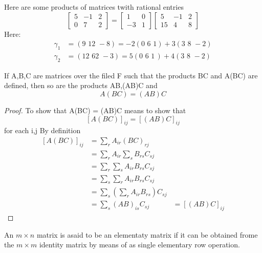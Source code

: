 \begin{example}
	Here are some products of matrices twith rational entries
	\[
		\begin{bmatrix}
			5 & -1 & 2 \\
			0 & 7  & 2
		\end{bmatrix} = \begin{bmatrix}
			1  & 0 \\
			-3 & 1
		\end{bmatrix} \begin{bmatrix} 5  & -1 & 2 \\
                15 & 4  & 8
		\end{bmatrix}
	\]
	Here:
	\[
		\begin{aligned}
			\gamma_{1} & =(9\,\,12\,\, -8) = -2(0\,\,6\,\,1)+3(3\,\,8\,\,-2)    \\
			\gamma_{2} & = (12\,\,62\,\,-3) = 5(0\,\,6\,\,1\,) +4(3\,\,8\,\,-2)
		\end{aligned}
	\]

\end{example}

\begin{theorem}
	If A,B,C are matrices over the filed F such that the products BC and A(BC) are defined, then so are the products AB,(AB)C and \[
		A(BC)=(AB)C
	\]
\end{theorem}


\begin{proof}
  To show that A(BC) = (AB)C means to show that \[
    [A(BC)]_{ij} = [(AB)C]_{ij}
  \]
  for each i,j By definition \[
    \begin{aligned}
      [A(BC)]_{ij} &= \sum\limits_{r}^{}A_{ir}(BC)_{rj}\\
                  &= \sum\limits_{r}^{}A_{ir}\sum\limits_{s}^{}B_{rs}C_{sj}\\
                  &= \sum\limits_{r}^{}\sum\limits_{s}^{}A_{ir}B_{rs}C_{sj}\\
                  &=\sum\limits_{s}^{}\sum\limits_{r}^{}A_{ir}B_{rs}C_{sj}\\
                  &=\sum\limits_{s}^{}(\sum\limits_{r}^{}A_{ir}B_{rs})C_{sj}\\
                  &= \sum\limits_{s}^{}(AB)_{is}C_{sj}
                  &=[(AB)C]_{ij}
    \end{aligned}
  \]
\end{proof}


\begin{definition}

	An \textbf{ $m \times n $} matrix is asaid to be an elementaty matrix if it can be obtained frome the $m \times m$ identity matrix by means of as single elementary row operation.

\end{definition}

